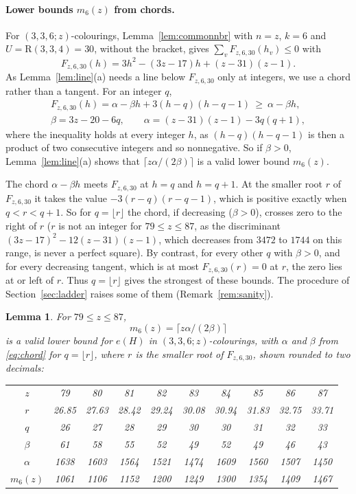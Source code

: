 \documentclass[11pt]{article}
\theoremstyle{spacedplain}
\newtheorem{lemma}[theorem]{Lemma}
\theoremstyle{spaceddef}
\theoremstyle{spacedremark}
\newcommand{\R}{\mathrm{R}}
\begin{document}
\paragraph{Lower bounds $m_6(z)$ from chords.}
For $(3,3,6;z)$-colourings, Lemma~\ref{lem:commonnbr} with $n=z$, $k=6$ and $U=\R(3,3,4)=30$, without the bracket, gives $\sum_vF_{z,6,30}(h_v)\le 0$ with
\[
F_{z,6,30}(h)=3h^2-(3z-17)h+(z-31)(z-1).
\]
As Lemma~\ref{lem:line}(a) needs a line below $F_{z,6,30}$ only at integers, we use a chord rather than a tangent.
For an integer $q$,
\begin{equation}\label{eq:chord}
\begin{gathered}
F_{z,6,30}(h)=\alpha-\beta h+3(h-q)(h-q-1)\ \ge\ \alpha-\beta h,\\
\beta=3z-20-6q,\qquad \alpha=(z-31)(z-1)-3q(q+1),
\end{gathered}
\end{equation}
where the inequality holds at every integer $h$, as $(h-q)(h-q-1)$ is then a product of two consecutive integers and so nonnegative.
So if $\beta>0$, Lemma~\ref{lem:line}(a) shows that $\lceil z\alpha/(2\beta)\rceil$ is a valid lower bound $m_6(z)$.

The chord $\alpha-\beta h$ meets $F_{z,6,30}$ at $h=q$ and $h=q+1$.
At the smaller root $r$ of $F_{z,6,30}$ it takes the value $-3(r-q)(r-q-1)$, which is positive exactly when $q<r<q+1$.
So for $q=\lfloor r\rfloor$ the chord, if decreasing ($\beta>0$), crosses zero to the right of $r$ ($r$ is not an integer for $79\le z\le 87$, as the discriminant $(3z-17)^2-12(z-31)(z-1)$, which decreases from $3472$ to $1744$ on this range, is never a perfect square).
By contrast, for every other $q$ with $\beta>0$, and for every decreasing tangent, which is at most $F_{z,6,30}(r)=0$ at $r$, the zero lies at or left of $r$.
Thus $q=\lfloor r\rfloor$ gives the strongest of these bounds.
The procedure of Section~\ref{sec:ladder} raises some of them (Remark~\ref{rem:sanity}).

\begin{lemma}\label{lem:m6more}
For $79\le z\le 87$,
\[
m_6(z)=\lceil z\alpha/(2\beta)\rceil
\]
is a valid lower bound for $e(H)$ in $(3,3,6;z)$-colourings, with $\alpha$ and $\beta$ from \eqref{eq:chord} for $q=\lfloor r\rfloor$, where $r$ is the smaller root of $F_{z,6,30}$, shown rounded to two decimals:
\begin{center}\small\upshape
\begin{tabular}{c*{9}{c}}
\toprule
$z$ &79&80&81&82&83&84&85&86&87\\
$r$ &26.85&27.63&28.42&29.24&30.08&30.94&31.83&32.75&33.71\\
$q$ &26&27&28&29&30&30&31&32&33\\
$\beta$ &61&58&55&52&49&52&49&46&43\\
$\alpha$ &1638&1603&1564&1521&1474&1609&1560&1507&1450\\
$m_6(z)$ &1061&1106&1152&1200&1249&1300&1354&1409&1467\\
\bottomrule
\end{tabular}
\end{center}
\end{lemma}
\end{document}
